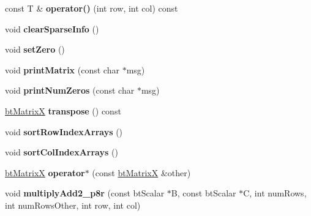 \begin{DoxyCompactItemize}
\item 
\mbox{\label{structbtMatrixX_a90c43d67b689b87b190c3a5f77799e54}} 
const T \& {\bfseries operator()} (int row, int col) const
\item 
\mbox{\label{structbtMatrixX_a0df163f737bf35a15119b02bebf01818}} 
void {\bfseries clear\+Sparse\+Info} ()
\item 
\mbox{\label{structbtMatrixX_a0bdf52f3712fe250237e792f1b0bcb9c}} 
void {\bfseries set\+Zero} ()
\item 
\mbox{\label{structbtMatrixX_aaef07244038148837ee8cf4ba132c22f}} 
void {\bfseries print\+Matrix} (const char $\ast$msg)
\item 
\mbox{\label{structbtMatrixX_aab5e0fb89759d2902b0e6d5b4eab88a4}} 
void {\bfseries print\+Num\+Zeros} (const char $\ast$msg)
\item 
\mbox{\label{structbtMatrixX_a2e980e331ffba26f028fb6b92df43317}} 
\hyperlink{structbtMatrixX}{bt\+MatrixX} {\bfseries transpose} () const
\item 
\mbox{\label{structbtMatrixX_a002ff38f37d306cb8f464d4893a05f2b}} 
void {\bfseries sort\+Row\+Index\+Arrays} ()
\item 
\mbox{\label{structbtMatrixX_ae95551ad50490b23b106819d6bca1c5c}} 
void {\bfseries sort\+Col\+Index\+Arrays} ()
\item 
\mbox{\label{structbtMatrixX_a34b8eb6349a9c4376e61844e1e0f9eeb}} 
\hyperlink{structbtMatrixX}{bt\+MatrixX} {\bfseries operator$\ast$} (const \hyperlink{structbtMatrixX}{bt\+MatrixX} \&other)
\item 
\mbox{\label{structbtMatrixX_ac1fa934d92fd3c7844e58febb00efb0b}} 
void {\bfseries multiply\+Add2\+\_\+p8r} (const bt\+Scalar $\ast$B, const bt\+Scalar $\ast$C, int num\+Rows, int num\+Rows\+Other, int row, int col)
\item 
\mbox{\label{structbtMatrixX_aae657343aaac366b1d255fde09b2c8c5}} 

\end{DoxyCompactItemize}
